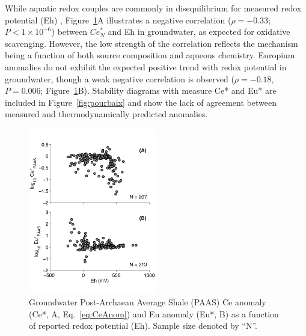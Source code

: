 While aquatic redox couples are commonly in disequilibrium for measured redox potential (Eh) \citep{Linberg_Sci_1984}, Figure~\ref{fig:anom_vs_Eh}A illustrates a negative correlation ($\rho=-0.33$; $P<1\times10^{-6}$) between $Ce_N^*$ and Eh in groundwater, as expected for oxidative scavenging.
However, the low strength of the correlation reflects the mechanism being a function of both source composition and aqueous chemistry.
Europium anomalies do not exhibit the expected positive trend with redox potential in groundwater, though a weak negative correlation is observed ($\rho= -0.18$, $P = 0.006$; Figure~\ref{fig:anom_vs_Eh}B).
Stability diagrams with measure Ce* and Eu* are included in Figure~\ref{fig:pourbaix} and show the lack of agreement between measured and thermodynamically predicted anomalies.

\begin{figure}[htbp]
\begin{center}
\includegraphics[width=0.5\textwidth]{Ch3_figures/Ce-Eu-anom-vs-Eh.pdf}
\caption{Groundwater Post-Archaean Average Shale (PAAS) Ce anomaly (Ce*, A, Eq.~\ref{eq:CeAnom}) and Eu anomaly (Eu*, B) as a function of reported redox potential (Eh).
Sample size denoted by ``N''.}\label{fig:anom_vs_Eh}
\end{center}
\end{figure}

